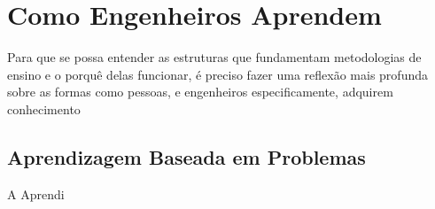\chapter{Como Engenheiros Aprendem} \label{ch:revisao_ensino}

	Para que se possa entender as estruturas que fundamentam metodologias de ensino e o porquê delas funcionar, é preciso fazer uma reflexão mais profunda sobre as formas como pessoas, e engenheiros especificamente, adquirem conhecimento

	\section{Aprendizagem Baseada em Problemas}

		A Aprendi
